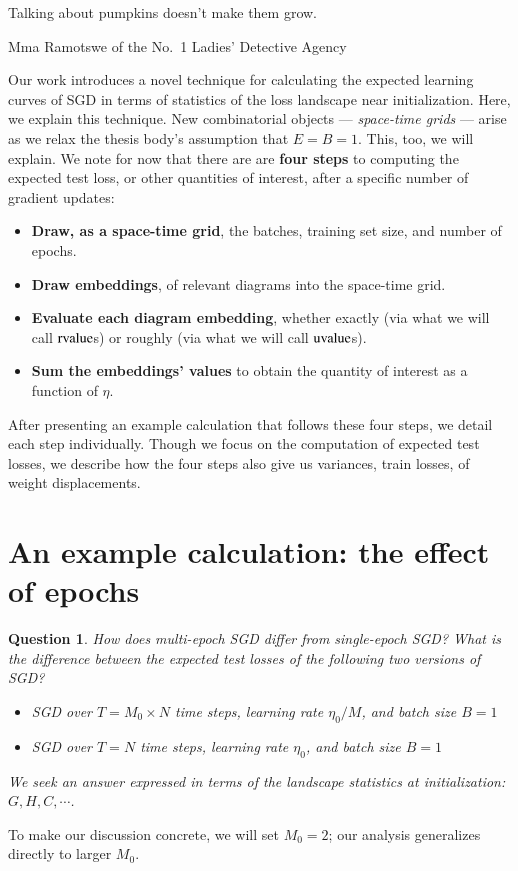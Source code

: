 \documentclass[openany, notitlepage, justified]{tufte-book}
\theoremstyle{plain}
\newtheorem{quest}{Question}
\theoremstyle{definition}
\newcommand{\uvalue}{\text{\textnormal{uvalue}}}
\newcommand{\rvalue}{\text{\textnormal{rvalue}}}
\begin{document}
    \renewcommand{\textflush}{flushright}
    \setlength{\epigraphwidth}{0.59\columnwidth}
    \epigraph{
        Talking about pumpkins doesn't make them grow.
    }{Mma Ramotswe of the No.\ 1 Ladies' Detective Agency}

    Our work introduces a novel technique for calculating the expected learning
    curves of SGD in terms of statistics of the loss landscape near
    initialization.  Here, we explain this technique.  New combinatorial
    objects --- \emph{space-time grids} --- arise as we relax the thesis body's
    assumption that $E=B=1$.  This, too, we will explain.  We note for now that
    there are are {\bf four steps} to computing the expected test loss, or
    other quantities of interest, after a specific number of gradient updates: 
    \begin{itemize}
        \item {\bf Draw, as a space-time grid}, the batches, training set
            size, and number of epochs.   
        \item {\bf Draw embeddings}, of relevant diagrams into the
            space-time grid.%
        \item {\bf Evaluate each diagram embedding}, whether exactly (via what
            we will call $\rvalue$s) or roughly (via what we will call
            $\uvalue$s).
        \item {\bf Sum the embeddings' values} to obtain the quantity of
              interest as a function of $\eta$.
    \end{itemize}

    After presenting an example calculation that follows these four steps,
    we detail each step individually.  Though we focus on the computation of
    expected test losses, we describe how the four steps also give us
    variances, train losses, of weight displacements.  

    \section{An example calculation: the effect of epochs}       \label{appendix:example}

        \begin{quest}\label{qst:multi}
            How does multi-epoch SGD differ from single-epoch SGD?
            What is the difference between the expected
            test losses of the following two versions of SGD?
            \begin{itemize}
                \item SGD over $T=M_0 \times N$ time steps, learning rate $\eta_0/M$, and
                    batch size $B=1$
                \item SGD over $T=N$ time steps, learning rate $\eta_0$, and batch size $B=1$
            \end{itemize}
            We seek an answer expressed in terms of the landscape statistics
            at initialization: $G,H,C, \cdots$.
        \end{quest}
        To make our discussion concrete, we will set $M_0=2$; our analysis 
        generalizes directly to larger $M_0$.
\end{document}
